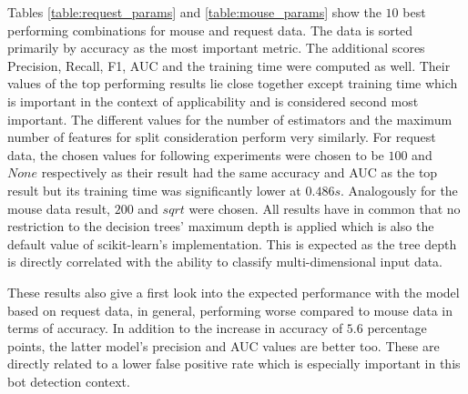 \documentclass[
    fontsize=12pt,
    headings=small,
    parskip=half,           %
    bibliography=totoc,
    numbers=noenddot,       %
    open=any,               %
    final,                   %
    table
]{scrreprt}
\begin{document}
Tables \ref{table:request_params} and \ref{table:mouse_params} show the $10$ best performing combinations for mouse  and request data. The data is sorted primarily by accuracy as the most important metric. The additional scores Precision, Recall, F1, AUC and the training time were computed as well. Their values of the top performing results lie close together except training time which is important in the context of applicability and is considered second most important. The different values for the number of estimators and the maximum number of features for split consideration perform very similarly. For request data, the chosen values for following experiments were chosen to be $100$ and $None$ respectively as their result had the same accuracy and AUC as the top result but its training time was significantly lower at $0.486s$. Analogously for the mouse data result, $200$ and $sqrt$ were chosen. All results have in common that no restriction to the decision trees' maximum depth is applied which is also the default value of scikit-learn's implementation. This is expected as the tree depth is directly correlated with the ability to classify multi-dimensional input data.

These results also give a first look into the expected performance with the model based on request data, in general, performing worse compared to mouse data in terms of accuracy. In addition to the increase in accuracy of $5.6$ percentage points, the latter model's precision and AUC values are better too. These are directly related to a lower false positive rate which is especially important in this bot detection context.
\end{document}
